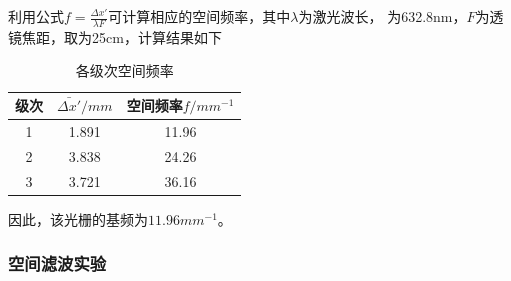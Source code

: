 \documentclass{article}
\begin{document}
    利用公式$f=\frac{\Delta x'}{\lambda F}$可计算相应的空间频率，其中$\lambda$为激光波长，
    为632.8nm，$F$为透镜焦距，取为25cm，计算结果如下

    \begin{table}[h]
        \centering
        \begin{tabular}{|c|c|c|}
            \hline
            级次 & $\bar{\Delta x'}/mm$ & 空间频率$f/mm^{-1}$ \\
            \hline
            1 & 1.891 & 11.96 \\
            \hline
            2 & 3.838 & 24.26 \\
            \hline
            3 & 3.721 & 36.16\\
            \hline
        \end{tabular}
        \caption{各级次空间频率}
    \end{table}

    因此，该光栅的基频为$11.96mm^{-1}$。

    \subsubsection{空间滤波实验}
\end{document}
